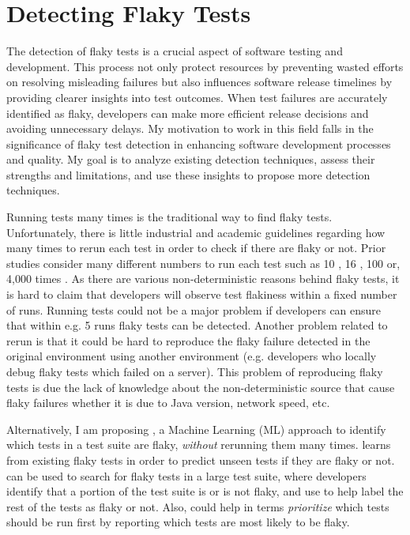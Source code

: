 \section{Detecting Flaky Tests}
\label{sec:detectFlakyTests}

The detection of flaky tests is a crucial aspect of software testing and development. This process not only protect resources by preventing wasted efforts on resolving misleading failures but also influences software release timelines by providing clearer insights into test outcomes. When test failures are accurately identified as flaky, developers can make more efficient release decisions and avoiding unnecessary delays. My motivation to work in this field falls in the significance of flaky test detection in enhancing software development processes and quality. My goal is to analyze existing detection techniques, assess their strengths and limitations, and use these insights to propose more detection techniques. 

Running tests many times is the traditional way to find flaky tests. Unfortunately, there is little industrial and academic guidelines regarding how many times to rerun each test in order to check if there are flaky or not. Prior studies consider many different numbers to run each test such as 10 \cite{bell2018deflaker}, 16 \cite{lam2019idflakies}, 100 \cite{lam2019root} or, 4,000 times \cite{lam2020Understanding}.
As there are various non-deterministic reasons behind flaky tests, it is hard to claim that developers will observe test flakiness within a fixed number of runs. 
Running tests could not be a major problem if developers can ensure that within e.g. 5 runs flaky tests can be detected.
Another problem related to rerun is that it could be hard to reproduce the flaky failure detected in the original environment using another environment (e.g. developers who locally debug flaky tests which failed on a server). This problem of reproducing flaky tests is due the lack of knowledge about the non-deterministic source that cause flaky failures whether it is due to Java version, network speed, etc. 


Alternatively, I am proposing \sysName, a Machine Learning (ML) approach to identify which tests in a test suite are flaky, \emph{without} rerunning them many times. \sysName learns from existing flaky tests in order to predict unseen tests if they are flaky or not. \sysName can be used to search for flaky tests in a large test suite, where developers identify that a portion of the test suite is or is not flaky, and use \sysName to help label the rest of the tests as flaky or not. Also, \sysName could help in terms \emph{prioritize} which tests should be run first by reporting which tests are most likely to be flaky. 


